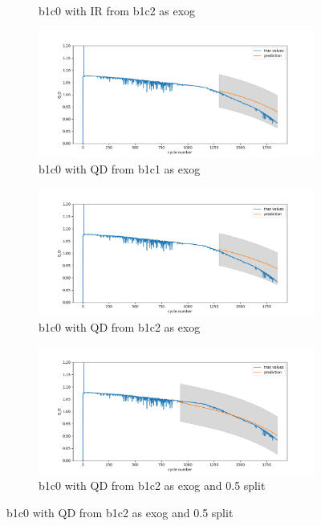 \documentclass{article}
\begin{document}
\begin{figure}[H]
\begin{subfigure}{.5\textwidth}
  \caption{b1c0 with IR from b1c2 as exog}
  \label{fig:sub3}
\end{subfigure}%
\begin{subfigure}{.5\textwidth}
  \centering
  \includegraphics[width=1\linewidth]{figs/auto_arima_exog(c1-QD)_03split_b1c0.png}
  \caption{b1c0 with QD from b1c1 as exog}
  \label{fig:sub4}
\end{subfigure}
\begin{subfigure}{.5\textwidth}
  \centering
  \includegraphics[width=1\linewidth]{figs/auto_arima_exog(c2-QD)_03split_b1c0.png}
  \caption{b1c0 with QD from b1c2 as exog}
  \label{fig:sub5}
\end{subfigure}%
\begin{subfigure}{.5\textwidth}
  \centering
  \includegraphics[width=1\linewidth]{figs/auto_arima_exog(c1-QD)_05split_b1c0.png}
  \caption{b1c0 with QD from b1c2 as exog and 0.5 split}
  \label{fig:sub6}
\end{subfigure}
\label{fig:auto_ARIMA_no_exog}
\end{figure}
\end{document}

